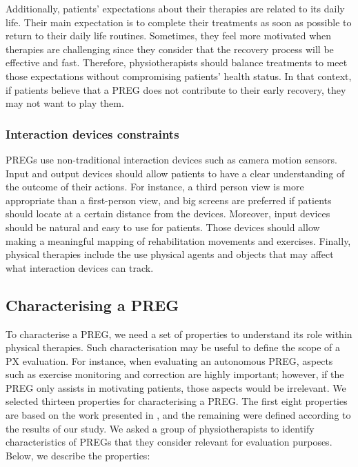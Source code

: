 Additionally, patients' expectations about their therapies are related to its daily life. Their main expectation is to complete their treatments as soon as possible to return to their daily life routines. Sometimes, they feel more motivated when therapies are challenging since they consider that the recovery process will be effective and fast. Therefore, physiotherapists should balance treatments to meet those expectations without compromising patients' health status. In that context, if patients believe that a \ac{PREG} does not contribute to their early recovery, they may not want to play them.

\subsubsection{Interaction devices constraints}
\label{sec:interation_dev_constraints}
\acp{PREG} use non-traditional interaction devices such as camera motion sensors. Input and output devices should allow patients to have a clear understanding of the outcome of their actions. For instance, a third person view is more appropriate than a first-person view, and big screens are preferred if patients should locate at a certain distance from the devices. Moreover, input devices should be natural and easy to use for patients. Those devices should allow making a meaningful mapping of rehabilitation movements and exercises. Finally, physical therapies include the use physical agents and objects that may affect what interaction devices can track.

\subsection{Characterising a \ac{PREG}} %
\label{sec:characterising}

To characterise a \ac{PREG}, we need a set of properties to understand its role within physical therapies. Such characterisation may be useful to define the scope of a PX evaluation. For instance, when evaluating an autonomous \ac{PREG}, aspects such as exercise monitoring and correction are highly important; however, if the \ac{PREG} only assists in motivating patients, those aspects would be irrelevant. We selected thirteen properties for characterising a \ac{PREG}. The first eight properties are based on the work presented in \autocite{PirovanoAdvisor2012}, and the remaining were defined according to the results of our study. We asked a group of physiotherapists to identify characteristics of \acp{PREG} that they consider relevant for evaluation purposes. Below, we describe the properties:

